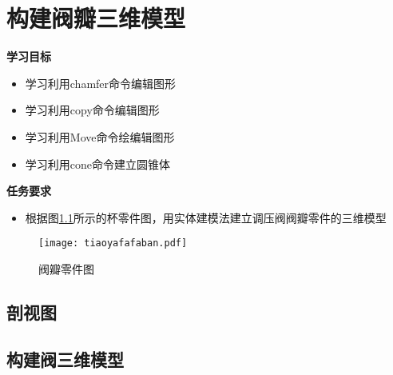 \chapter{构建阀瓣三维模型}

{\bfseries 学习目标}
\begin{itemize}
\item 学习利用chamfer命令编辑图形
\item 学习利用copy命令编辑图形
\item 学习利用Move命令绘编辑图形
\item 学习利用cone命令建立圆锥体
\end{itemize}

{\bfseries 任务要求}
\begin{itemize}
\item 根据图\ref{fig:tiaoyafafaban}所示的杯零件图，用实体建模法建立调压阀阀瓣零件的三维模型
\end{itemize}

\noindent
\begin{figure}[htbp]
\centering
\texttt{[image: tiaoyafafaban.pdf]}
\caption{阀瓣零件图}\label{fig:tiaoyafafaban}
\end{figure}
\clearpage
\section{剖视图}

\section{构建阀三维模型}


\endinput